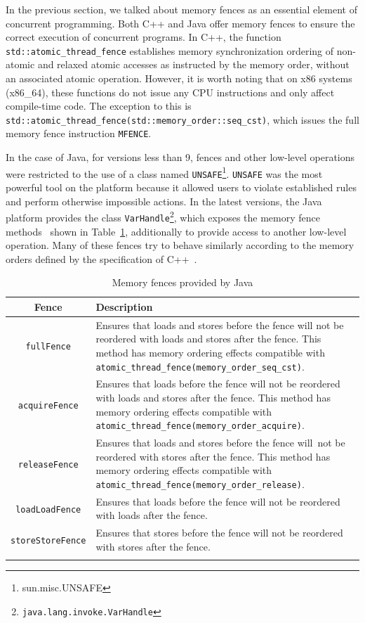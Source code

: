 In the previous section, we talked about memory fences as an essential element of concurrent programming. Both C++ and Java offer memory fences to ensure the correct execution of concurrent programs. In C++, the function \texttt{std::atomic\_thread\_fence} establishes memory synchronization ordering of non-atomic and relaxed atomic accesses as instructed by the memory order, without an associated atomic operation. However, it is worth noting that on x86 systems (x86\_64), these functions do not issue any CPU instructions and only affect compile-time code. The exception to this is \texttt{std::atomic\_thread\_fence(std::memory\_order::seq\_cst)}, which issues the full memory fence instruction \texttt{MFENCE}.


In the case of Java, for versions less than 9, fences and other low-level operations were restricted to the use of a class named \texttt{UNSAFE}\footnote{sun.misc.UNSAFE}. \texttt{UNSAFE} was the most powerful tool on the platform because it allowed users to violate established rules and perform otherwise impossible actions. In the latest versions, the Java platform provides the class \texttt{VarHandle}\footnote{\texttt{java.lang.invoke.VarHandle}}, which exposes the memory fence methods~\cite{varHandleJdk92017} shown in Table~\ref{table:fences}, additionally to provide access to another low-level operation. Many of these fences try to behave similarly according to the memory orders defined by the specification of C++~\cite{memoryOrderCpp2020}.


  \begin{longtable}{|c|p{.72\linewidth}|}
    \hline
    \textbf{Fence} & \textbf{Description} \\
    \hline
    \texttt{fullFence} & Ensures that loads and stores before the fence will not be reordered with loads and stores after the fence. This method has memory ordering effects compatible with \texttt{atomic\_thread\_fence(memory\_order\_seq\_cst)}.\\
    \hline
    \texttt{acquireFence} & Ensures that loads before the fence will not be reordered with loads and stores after the fence. This method has memory ordering effects compatible with \texttt{atomic\_thread\_fence(memory\_order\_acquire)}.\\
    \hline
    \texttt{releaseFence} & Ensures that loads and stores before the fence will\ not be reordered with stores after the fence. This method has memory ordering effects compatible with  \texttt{atomic\_thread\_fence(memory\_order\_release)}.\\
    \hline
    \texttt{loadLoadFence} & Ensures that loads before the fence will not be reordered with loads after the fence.\\
    \hline
    \texttt{storeStoreFence} & Ensures that stores before the fence will not be reordered with stores after the fence.\\
    \hline
    \caption{\label{table:fences}Memory fences provided by Java}
  \end{longtable}


